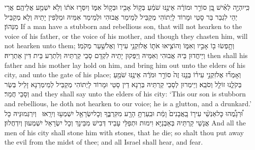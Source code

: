 {כִּֽי\maqqaf יִהְיֶ֣ה לְאִ֗ישׁ בֵּ֚ן סוֹרֵ֣ר וּמוֹרֶ֔ה אֵינֶ֣נּוּ שֹׁמֵ֔עַ בְּק֥וֹל אָבִ֖יו וּבְק֣וֹל אִמּ֑וֹ וְיִסְּר֣וּ אֹת֔וֹ וְלֹ֥א יִשְׁמַ֖ע אֲלֵיהֶֽם׃}
{אֲרֵי יְהֵי לִגְבַר בַּר סָטֵי וּמָרוֹד לָיְתוֹהִי מְקַבֵּיל לְמֵימַר אֲבוּהִי וּלְמֵימַר אִמֵּיהּ וּמַלְּפִין יָתֵיהּ וְלָא מְקַבֵּיל מִנְּהוֹן׃}
{If a man have a stubborn and rebellious son, that will not hearken to the voice of his father, or the voice of his mother, and though they chasten him, will not hearken unto them;}{}
{וְתָ֥פְשׂוּ ב֖וֹ אָבִ֣יו וְאִמּ֑וֹ וְהוֹצִ֧יאוּ אֹת֛וֹ אֶל\maqqaf זִקְנֵ֥י עִיר֖וֹ וְאֶל\maqqaf שַׁ֥עַר מְקֹמֽוֹ׃}
{וְיֵיחֲדוּן בֵּיהּ אֲבוּהִי וְאִמֵּיהּ וְיַפְּקוּן יָתֵיהּ לִקְדָם סָבֵי קַרְתֵּיהּ וְלִתְרַע בֵּית דִּין אַתְרֵיהּ׃}
{then shall his father and his mother lay hold on him, and bring him out unto the elders of his city, and unto the gate of his place;}{}
{וְאָמְר֞וּ אֶל\maqqaf זִקְנֵ֣י עִיר֗וֹ בְּנֵ֤נוּ זֶה֙ סוֹרֵ֣ר וּמֹרֶ֔ה אֵינֶ֥נּוּ שֹׁמֵ֖עַ בְּקֹלֵ֑נוּ זוֹלֵ֖ל וְסֹבֵֽא׃}
{וְיֵימְרוּן לְסָבֵי קַרְתֵּיהּ בְּרַנָא דֵין סָטֵי וּמָרוֹד לָיְתוֹהִי מְקַבֵּיל לְמֵימְרַנָא זָלֵיל בְּשַׂר וְסָבֵי חֲמַר׃}
{and they shall say unto the elders of his city: ‘This our son is stubborn and rebellious, he doth not hearken to our voice; he is a glutton, and a drunkard.’}{}
{וּ֠רְגָמֻ֠הוּ כׇּל\maqqaf אַנְשֵׁ֨י עִיר֤וֹ בָֽאֲבָנִים֙ וָמֵ֔ת וּבִֽעַרְתָּ֥ הָרָ֖ע מִקִּרְבֶּ֑ךָ וְכׇל\maqqaf יִשְׂרָאֵ֖ל יִשְׁמְע֥וּ וְיִרָֽאוּ׃ \setuma }
{וְיִרְגְּמוּנֵּיהּ כָּל אֲנָשֵׁי קַרְתֵּיהּ בְּאַבְנַיָּא וִימוּת וּתְפַלֵּי עָבֵיד דְּבִישׁ מִבֵּינָךְ וְכָל יִשְׂרָאֵל יִשְׁמְעוּן וְיִדְחֲלוּן׃}
{And all the men of his city shall stone him with stones, that he die; so shalt thou put away the evil from the midst of thee; and all Israel shall hear, and fear.}{}
